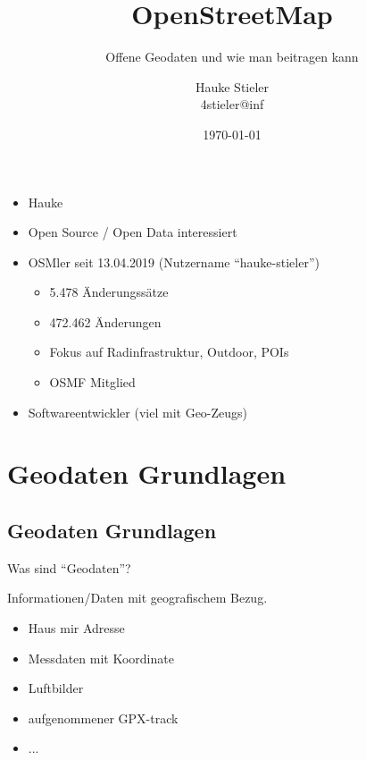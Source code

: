 \documentclass{beamer}
\title{OpenStreetMap}
\subtitle{Offene Geodaten und wie man beitragen kann}
\author{Hauke Stieler\\4stieler@inf}
\date{\today}
\begin{document}
	\maketitle
	
	\begin{frame}
		\begin{itemize}
			\item Hauke
			\item Open Source / Open Data interessiert\pause
			\item OSMler seit 13.04.2019 (Nutzername \enquote{hauke-stieler})
			\begin{itemize}
				\item 5.478 Änderungssätze
				\item 472.462 Änderungen
				\item Fokus auf Radinfrastruktur, Outdoor, POIs
				\item OSMF Mitglied
			\end{itemize}\pause
			\item Softwareentwickler (viel mit Geo-Zeugs)
		\end{itemize}
	\end{frame}
	
	\begin{frame}
		\tableofcontents
	\end{frame}
	
	\section{Geodaten Grundlagen}
	
		\subsection{Geodaten Grundlagen}
	
		\begin{frame}{Was sind \enquote{Geodaten}?}
			\begin{definition}
				Informationen/Daten mit geografischem Bezug.
			\end{definition}
			\begin{itemize}
				\item Haus mir Adresse\pause
				\item Messdaten mit Koordinate\pause
				\item Luftbilder\pause
				\item aufgenommener GPX-track\pause
				\item ...
			\end{itemize}
		\end{frame}
		
\end{document}

